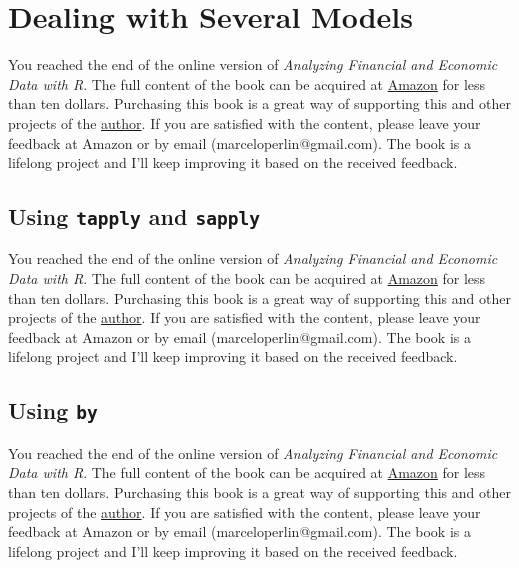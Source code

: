 \documentclass[
  12pt,
]{book}
\newenvironment{pleasebuyit}
{\begin{noteblock}
		
	} {\end{noteblock}}
\begin{document}
\hypertarget{dealing-with-several-models}{%
\section{Dealing with Several Models}\label{dealing-with-several-models}}

\begin{pleasebuyit}
You reached the end of the online version of \emph{Analyzing Financial
and Economic Data with R}. The full content of the book can be acquired
at \href{https://www.amazon.com/dp/B084LSNXMN}{Amazon} for less than ten
dollars. Purchasing this book is a great way of supporting this and
other projects of the \href{https://www.msperlin.com/}{author}. If you
are satisfied with the content, please leave your feedback at Amazon or
by email (marceloperlin@gmail.com). The book is a lifelong project and
I'll keep improving it based on the received feedback.
\end{pleasebuyit}

\hypertarget{using-tapply-and-sapply}{%
\subsection{\texorpdfstring{Using \texttt{tapply} and \texttt{sapply}}{Using tapply and sapply}}\label{using-tapply-and-sapply}}

\begin{pleasebuyit}
You reached the end of the online version of \emph{Analyzing Financial
and Economic Data with R}. The full content of the book can be acquired
at \href{https://www.amazon.com/dp/B084LSNXMN}{Amazon} for less than ten
dollars. Purchasing this book is a great way of supporting this and
other projects of the \href{https://www.msperlin.com/}{author}. If you
are satisfied with the content, please leave your feedback at Amazon or
by email (marceloperlin@gmail.com). The book is a lifelong project and
I'll keep improving it based on the received feedback.
\end{pleasebuyit}

\hypertarget{using-by-1}{%
\subsection{\texorpdfstring{Using \texttt{by}}{Using by}}\label{using-by-1}}

\begin{pleasebuyit}
You reached the end of the online version of \emph{Analyzing Financial
and Economic Data with R}. The full content of the book can be acquired
at \href{https://www.amazon.com/dp/B084LSNXMN}{Amazon} for less than ten
dollars. Purchasing this book is a great way of supporting this and
other projects of the \href{https://www.msperlin.com/}{author}. If you
are satisfied with the content, please leave your feedback at Amazon or
by email (marceloperlin@gmail.com). The book is a lifelong project and
I'll keep improving it based on the received feedback.
\end{pleasebuyit}
\end{document}
